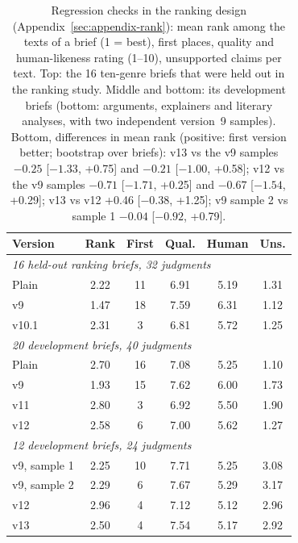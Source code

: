 \documentclass[11pt]{article}
\begin{document}
\begin{table}[t]
\centering\small
\setlength{\tabcolsep}{3pt}
\begin{tabular}{lccccc}
\toprule
Version & Rank & First & Qual. & Human & Uns. \\
\midrule
\multicolumn{6}{l}{\emph{16 held-out ranking briefs, 32 judgments}} \\
Plain & 2.22 & 11 & 6.91 & 5.19 & 1.31 \\
v9 & 1.47 & 18 & 7.59 & 6.31 & 1.12 \\
v10.1 & 2.31 & 3 & 6.81 & 5.72 & 1.25 \\
\midrule
\multicolumn{6}{l}{\emph{20 development briefs, 40 judgments}} \\
Plain & 2.70 & 16 & 7.08 & 5.25 & 1.10 \\
v9 & 1.93 & 15 & 7.62 & 6.00 & 1.73 \\
v11 & 2.80 & 3 & 6.92 & 5.50 & 1.90 \\
v12 & 2.58 & 6 & 7.00 & 5.62 & 1.27 \\
\midrule
\multicolumn{6}{l}{\emph{12 development briefs, 24 judgments}} \\
v9, sample 1 & 2.25 & 10 & 7.71 & 5.25 & 3.08 \\
v9, sample 2 & 2.29 & 6 & 7.67 & 5.29 & 3.17 \\
v12 & 2.96 & 4 & 7.12 & 5.12 & 2.96 \\
v13 & 2.50 & 4 & 7.54 & 5.17 & 2.92 \\
\bottomrule
\end{tabular}
\caption{Regression checks in the ranking design (Appendix~\ref{sec:appendix-rank}): mean rank among the texts of a brief (1 = best), first places, quality and human-likeness rating (1--10), unsupported claims per text. Top: the 16 ten-genre briefs that were held out in the ranking study. Middle and bottom: its development briefs (bottom: arguments, explainers and literary analyses, with two independent version~9 samples). Bottom, differences in mean rank (positive: first version better; bootstrap over briefs): v13 vs the v9 samples $-0.25$ [$-1.33$, +0.75] and $-0.21$ [$-1.00$, +0.58]; v12 vs the v9 samples $-0.71$ [$-1.71$, +0.25] and $-0.67$ [$-1.54$, +0.29]; v13 vs v12 +0.46 [$-0.38$, +1.25]; v9 sample 2 vs sample 1 $-0.04$ [$-0.92$, +0.79].}
\label{tab:regression}
\end{table}
\end{document}

